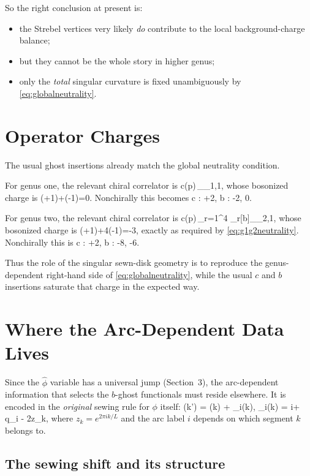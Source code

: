 \documentclass[12pt]{article}
\newcommand{\wt}[1]{\widetilde{#1}}
\begin{document}
So the right conclusion at present is:
\begin{itemize}
\item the Strebel vertices very likely \emph{do} contribute to the local background-charge balance;
\item but they cannot be the whole story in higher genus;
\item only the \emph{total} singular curvature is fixed unambiguously by \eqref{eq:globalneutrality}.
\end{itemize}

\section{Operator Charges}

The usual ghost insertions already match the global neutrality condition.

For genus one, the relevant chiral correlator is
\be
\la c(p)\,\cL[b]\ra_{\Sigma_{1,1}},
\ee
whose bosonized charge is
\be
(+1)+(-1)=0.
\label{eq:g1insertions}
\ee
Nonchirally this becomes
\be
c\wt c : +2,
\qquad
b\wt b : -2,
\qquad
{}0.
\ee

For genus two, the relevant chiral correlator is
\be
\la c(p)\,\prod_{r=1}^4 \cL_r[b]\ra_{\Sigma_{2,1}},
\ee
whose bosonized charge is
\be
(+1)+4(-1)=-3,
\label{eq:g2insertions}
\ee
exactly as required by \eqref{eq:g1g2neutrality}. Nonchirally this is
\be
c\wt c : +2,
\times b\wt b : -8,
\qquad
{}-6.
\ee

Thus the role of the singular sewn-disk geometry is to reproduce the genus-dependent right-hand side of \eqref{eq:globalneutrality}, while the usual $c$ and $b$ insertions saturate that charge in the expected way.

\section{Where the Arc-Dependent Data Lives}

Since the $\hat\phi$ variable has a universal jump (Section~3), the arc-dependent information that selects the $b$-ghost functionals must reside elsewhere. It is encoded in the \emph{original} sewing rule for $\phi$ itself:
\be
\phi(k') = \phi(k) + \Delta_i(k),
\qquad
\Delta_i(k) = i\pi + \log q_i - 2\log z_k,
\label{eq:phishift}
\ee
where $z_k = e^{2\pi i k/L}$ and the arc label $i$ depends on which segment $k$ belongs to.

\subsection{The sewing shift and its structure}
\end{document}
